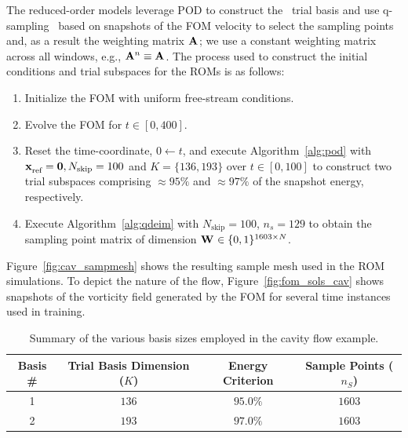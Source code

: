 The reduced-order models leverage POD to construct the \spatialAcronym\ trial basis and use q-sampling~\cite{qdeim_drmac} based on snapshots of the FOM velocity to select the sampling points and, as a result the weighting 
matrix $\mathbf{A}^{}$; we use a constant weighting matrix across all windows, e.g., $\mathbf{A}^{n} \equiv \mathbf{A}^{}$. The process used to construct the initial conditions and trial subspaces for the ROMs is as follows:
\begin{enumerate}
\item Initialize the FOM with uniform free-stream conditions.
\item Evolve the FOM for $t \in [0,400]$.
\item Reset the time-coordinate, $0 \leftarrow t$, and execute Algorithm~\ref{alg:pod} with $\mathbf{x}_\text{ref}^{} = \boldsymbol 0, N_{\text{skip}} = 100$ and $K = \{136,193\}$ over $t \in [0,100]$ to construct two trial subspaces comprising $\approx 95\%$ and $\approx 97\%$ of the snapshot energy, respectively. 
\item Execute Algorithm~\ref{alg:qdeim} with $N_{\text{skip}} = 100$, $n_s = 129$ to obtain the sampling point matrix of dimension $\mathbf{W}^{} \in \{0,1\}^{1603 \times N }$. 
\end{enumerate}
Figure~\ref{fig:cav_sampmesh} shows the resulting sample mesh used in the ROM simulations. To depict the nature of the flow, Figure~\ref{fig:fom_sols_cav} shows snapshots of the vorticity field generated by the FOM for several time instances used in training.  
\begin{table}[]
\begin{centering}
\begin{tabular}{c c c c}
\hline
Basis \# & Trial Basis Dimension ($K$) &  Energy Criterion & Sample Points ($n_S$) \\
\hline
1    & $136$ & $95.0\%$ & $1603$ \\
2    & $193$ & $97.0\%$ & $1603$ \\
\hline
\end{tabular}
\caption{Summary of the various basis sizes employed in the cavity flow example.}
\label{tab:rom_basis_details}
\end{centering}
\end{table}

